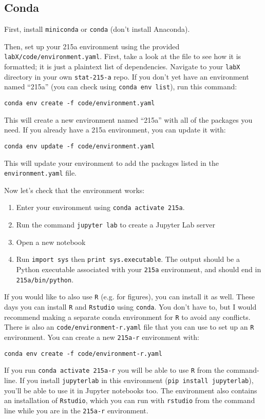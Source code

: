 \documentclass[letterpaper,12pt]{article}
\begin{document}
\subsection{Conda}

First, install \texttt{miniconda} or \texttt{conda} (don't install Anaconda).

Then, set up your 215a environment using the provided \texttt{labX/code/environment.yaml}. First, take a look at the file to see how it is formatted; it is just a plaintext list of dependencies. Navigate to your \texttt{labX} directory in your own \texttt{stat-215-a} repo. If you don't yet have an environment named ``215a'' (you can check using \texttt{conda env list}), run this command:
\begin{verbatim}
conda env create -f code/environment.yaml
\end{verbatim}
This will create a new environment named ``215a'' with all of the packages you need. If you already have a 215a environment, you can update it with:
\begin{verbatim}
conda env update -f code/environment.yaml
\end{verbatim}
This will update your environment to add the packages listed in the \texttt{environment.yaml} file.

Now let's check that the environment works:
\begin{enumerate}
    \item Enter your environment using \texttt{conda activate 215a}.
    \item Run the command \texttt{jupyter lab} to create a Jupyter Lab server
    \item Open a new notebook
    \item Run \texttt{import sys} then \texttt{print sys.executable}. The output should be a Python executable associated with your \texttt{215a} environment, and should end in \texttt{215a/bin/python}.
\end{enumerate}
If you would like to also use \texttt{R} (e.g. for figures), you can install it as well. These days you can install \texttt{R} and \texttt{Rstudio} using \texttt{conda}. You don't have to, but I would recommend making a separate conda environment for \texttt{R} to avoid any conflicts. There is also an \texttt{code/environment-r.yaml} file that you can use to set up an \texttt{R} environment. You can create a new \texttt{215a-r} environment with:
\begin{verbatim}
conda env create -f code/environment-r.yaml
\end{verbatim}
If you run \texttt{conda activate 215a-r} you will be able to use \texttt{R} from the command-line. If you install \texttt{jupyterlab} in this environment (\texttt{pip install jupyterlab}), you'll be able to use it in Jupyter notebooks too. The environment also contains an installation of \texttt{Rstudio}, which you can run with \texttt{rstudio} from the command line while you are in the \texttt{215a-r} environment.
\end{document}
